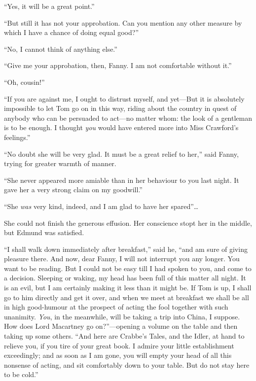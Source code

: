 ``Yes, it will be a great point.''

``But still it has not your approbation.  Can you mention
any other measure by which I have a chance of doing
equal good?''

``No, I cannot think of anything else.''

``Give me your approbation, then, Fanny.  I am not
comfortable without it.''

``Oh, cousin!''

``If you are against me, I ought to distrust myself,
and yet---But it is absolutely impossible to let Tom
go on in this way, riding about the country in quest
of anybody who can be persuaded to act---no matter whom:
the look of a gentleman is to be enough.  I thought \emph{you}
would have entered more into Miss Crawford's feelings.''

``No doubt she will be very glad.  It must be a great relief
to her,'' said Fanny, trying for greater warmth of manner.

``She never appeared more amiable than in her behaviour
to you last night.  It gave her a very strong claim
on my goodwill.''

``She \emph{was} very kind, indeed, and I am glad to have her
spared''\ldots

She could not finish the generous effusion.  Her conscience
stopt her in the middle, but Edmund was satisfied.

``I shall walk down immediately after breakfast,'' said he,
``and am sure of giving pleasure there.  And now, dear Fanny,
I will not interrupt you any longer.  You want to be reading.
But I could not be easy till I had spoken to you,
and come to a decision.  Sleeping or waking, my head
has been full of this matter all night.  It is an evil,
but I am certainly making it less than it might be.
If Tom is up, I shall go to him directly and get it over,
and when we meet at breakfast we shall be all in high
good-humour at the prospect of acting the fool together
with such unanimity.  \emph{You}, in the meanwhile, will be taking
a trip into China, I suppose.  How does Lord Macartney
go on?''---opening a volume on the table and then taking up
some others.  ``And here are Crabbe's Tales, and the Idler,
at hand to relieve you, if you tire of your great book.
I admire your little establishment exceedingly; and as
soon as I am gone, you will empty your head of all this
nonsense of acting, and sit comfortably down to your table.
But do not stay here to be cold.''

